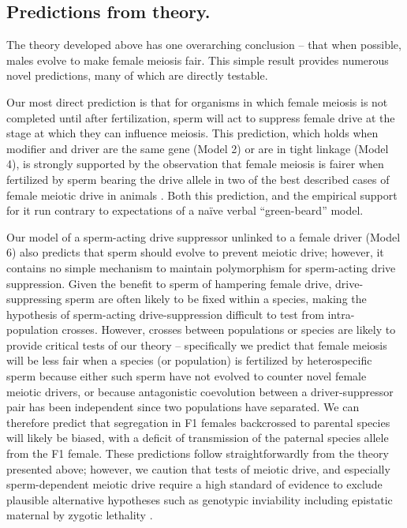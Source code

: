 \documentclass[12pt,letterpaper]{article}
\begin{document}
\subsection*{Predictions from theory.} 

The theory developed above has one overarching conclusion -- that when possible, males evolve to make female meiosis fair. 
This simple result provides numerous novel predictions, many of which are directly testable. 

Our most direct prediction is that for organisms in which female  meiosis is not completed until after fertilization, 
	sperm will act to suppress female drive at the stage at which they can influence meiosis. 
This prediction, which holds when modifier and driver are the same gene (Model 2) or are in tight linkage (Model 4),  
	is strongly supported by the observation that female meiosis 
	is fairer when fertilized by sperm bearing the drive allele in 
	two of the best described cases of female meiotic drive in 
	animals \citep[the \emph{Om} and \emph{In} loci in mice, ][]{Agulnik1993,Wu2005}.  
Both this prediction, and the empirical support for it run contrary to expectations of a na\"{i}ve verbal ``green-beard'' model. 


Our model of a sperm-acting drive suppressor unlinked to a female driver (Model 6) also predicts that sperm should evolve to prevent meiotic drive; 
	however, it contains no simple mechanism to maintain polymorphism for sperm-acting drive suppression.
Given the benefit to sperm of hampering female drive, 
	drive-suppressing sperm are often likely to be fixed within a species, 
	making the hypothesis of sperm-acting drive-suppression difficult to test from intra-population crosses. 
However, crosses between populations or species are likely to provide critical tests of our theory -- 
	specifically we predict that female meiosis will be less fair when a species (or population) is 
	fertilized by heterospecific sperm because either such sperm have not evolved to counter novel female meiotic drivers, 
	or because antagonistic coevolution between a driver-suppressor pair has been independent since two populations have separated. 
We can therefore predict that segregation in F1 females backcrossed to parental species will likely be biased, 
	with a deficit of transmission of the paternal species allele from the F1  female.   
These predictions follow straightforwardly from the
	theory presented above; however, we caution that tests of meiotic drive, 
	and especially sperm-dependent meiotic drive require a high standard
	of evidence  to exclude plausible alternative hypotheses such as genotypic 
	inviability including epistatic maternal by zygotic lethality \citep[e.g. ][]{Sawamura:1993aa}.  
\end{document}

